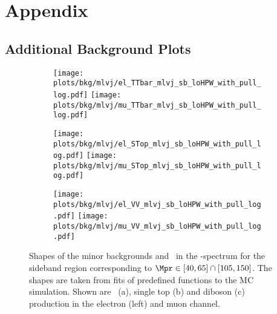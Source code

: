 

\chapter{Appendix}   
\label{chap:appendix}


\section{Additional Background Plots}
\label{sec:appendix:bkgplots}
\begin{figure}
	\centering
	\begin{subfigure}{0.8\textwidth}
		\texttt{[image: plots/bkg/mlvj/el\_TTbar\_mlvj\_sb\_loHPW\_with\_pull\_log.pdf]}		
		\texttt{[image: plots/bkg/mlvj/mu\_TTbar\_mlvj\_sb\_loHPW\_with\_pull\_log.pdf]}		
		\caption{}
	\end{subfigure}
	\begin{subfigure}{0.8\textwidth}
		\texttt{[image: plots/bkg/mlvj/el\_STop\_mlvj\_sb\_loHPW\_with\_pull\_log.pdf]}
		\texttt{[image: plots/bkg/mlvj/mu\_STop\_mlvj\_sb\_loHPW\_with\_pull\_log.pdf]}	
		\caption{}	
	\end{subfigure}
	\begin{subfigure}{0.8\textwidth}
		\texttt{[image: plots/bkg/mlvj/el\_VV\_mlvj\_sb\_loHPW\_with\_pull\_log.pdf]}
		\texttt{[image: plots/bkg/mlvj/mu\_VV\_mlvj\_sb\_loHPW\_with\_pull\_log.pdf]}
		\caption{}
	\end{subfigure}	
	\caption[Shapes of the minor backgrounds and \ttbar \ in the \MWV -spectrum for the sideband region]{Shapes of the minor backgrounds and \ttbar \ in the \MWV -spectrum for the sideband region corresponding to $\Mpr \in [40,65]\cap[105,150]$. The shapes are taken from fits of predefined functions to the MC simulation. Shown are \ttbar \ (a), single top (b) and diboson (c) production in the electron (left) and muon channel.}
	\label{fig:app:mwv_sb_minor}
\end{figure}

